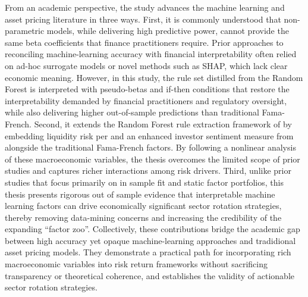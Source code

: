 From an academic perspective, the study advances the machine learning and asset pricing literature in three ways. First, it is commonly understood that non-parametric models, while delivering high predictive power, cannot provide the same beta coefficients that finance practitioners require. Prior approaches to reconciling machine-learning accuracy with financial interpretability often relied on ad-hoc surrogate models or novel methods such as SHAP, which lack clear economic meaning. However, in this study, the rule set distilled from the Random Forest is interpreted with pseudo-betas and if-then conditions that restore the interpretability demanded by financial practitioners and regulatory oversight, while also delivering higher out-of-sample predictions than traditional Fama-French. Second, it extends the Random Forest rule extraction framework of  by embedding liquidity risk per  and an enhanced investor sentiment measure from  alongside the traditional Fama-French factors. By following a nonlinear analysis of these macroeconomic variables, the thesis overcomes the limited scope of prior studies and captures richer interactions among risk drivers. Third, unlike prior studies that focus primarily on in sample fit and static factor portfolios, this thesis presents rigorous out of sample evidence that interpretable machine learning factors can drive economically significant sector rotation strategies, thereby removing data-mining concerns and increasing the credibility of the expanding “factor zoo”. Collectively, these contributions bridge the academic gap between high accuracy yet opaque machine-learning approaches and tradidional asset pricing models. They demonstrate a practical path for incorporating rich macroeconomic variables into risk return frameworks without sacrificing transparency or theoretical coherence, and establishes the validity of actionable sector rotation strategies.



